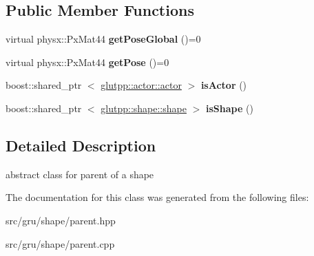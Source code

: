 \subsection*{\-Public \-Member \-Functions}
\begin{DoxyCompactItemize}
\item 
\hypertarget{classglutpp_1_1shape_1_1parent_a9ead2abbf18ef98c91e13f30be9800b3}{virtual physx\-::\-Px\-Mat44 {\bfseries get\-Pose\-Global} ()=0}\label{classglutpp_1_1shape_1_1parent_a9ead2abbf18ef98c91e13f30be9800b3}

\item 
\hypertarget{classglutpp_1_1shape_1_1parent_a14d46d2a6c3af5ff76f98ca7937c47d4}{virtual physx\-::\-Px\-Mat44 {\bfseries get\-Pose} ()=0}\label{classglutpp_1_1shape_1_1parent_a14d46d2a6c3af5ff76f98ca7937c47d4}

\item 
\hypertarget{classglutpp_1_1shape_1_1parent_a705464e43bd758db0b3131449da413cc}{boost\-::shared\-\_\-ptr\*
$<$ \hyperlink{classglutpp_1_1actor_1_1actor}{glutpp\-::actor\-::actor} $>$ {\bfseries is\-Actor} ()}\label{classglutpp_1_1shape_1_1parent_a705464e43bd758db0b3131449da413cc}

\item 
\hypertarget{classglutpp_1_1shape_1_1parent_a794d45acffc1ff512f02fe0db48a72ae}{boost\-::shared\-\_\-ptr\*
$<$ \hyperlink{classglutpp_1_1shape_1_1shape}{glutpp\-::shape\-::shape} $>$ {\bfseries is\-Shape} ()}\label{classglutpp_1_1shape_1_1parent_a794d45acffc1ff512f02fe0db48a72ae}

\end{DoxyCompactItemize}


\subsection{\-Detailed \-Description}
abstract class for parent of a shape 

\-The documentation for this class was generated from the following files\-:\begin{DoxyCompactItemize}
\item 
src/gru/shape/parent.\-hpp\item 
src/gru/shape/parent.\-cpp\end{DoxyCompactItemize}
